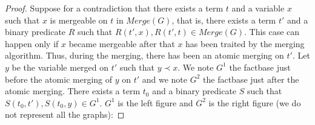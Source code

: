 \documentclass{article}
\theoremstyle{definition}
\theoremstyle{remark}
\newcommand{\Merge}{\textit{Merge}}
\begin{document}
\begin{proof} 
Suppose for a contradiction that there exists a term $t$ and a variable $x$ such that $x$ is mergeable on $t$ in $\Merge(G)$, that is, there exists a term $t'$ and a binary predicate $R$ such that $R(t',x),R(t',t) \in \Merge(G)$. This case can happen only if $x$ became mergeable  after that $x$ has been traited by the merging algorithm. Thus, during the merging, there has been an atomic merging on $t'$. Let $y$ be the variable merged on $t'$ such that $y \prec x$. We note $G^1$ the factbase just before the atomic merging of $y$ on $t'$ and we note $G^2$ the factbase just after the atomic merging. There exists a term $t_0$ and a binary predicate $S$ such that $S(t_0,t'),S(t_0,y) \in G^1$. $G^1$ is the left figure and $G^2$ is the right figure (we do not represent all the graphs):


\end{proof}
\end{document}

